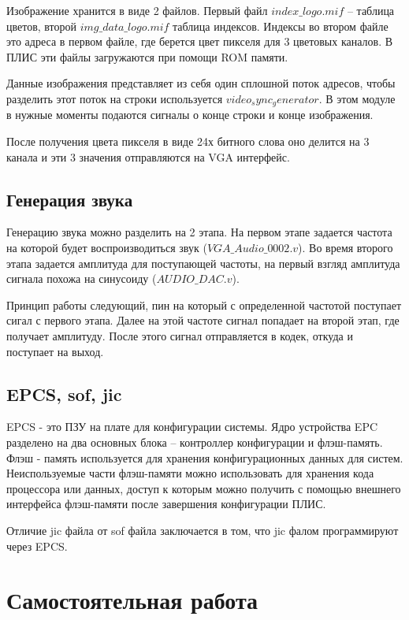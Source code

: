 \documentclass[a4paper,14pt]{article}
\begin{document}
		Изображение хранится в виде 2 файлов.
		Первый файл $index\_logo.mif$ -- таблица цветов, второй $img\_data\_logo.mif$ таблица индексов.
		Индексы во втором файле это адреса в первом файле, где берется цвет пикселя для 3 цветовых каналов.
		В ПЛИС эти файлы загружаются при помощи ROM памяти.
		
		Данные изображения представляет из себя один сплошной поток адресов, чтобы разделить этот поток на строки используется $video_sync_generator$.
		В этом модуле в нужные моменты подаются сигналы о конце строки и конце изображения.
		
		После получения цвета пикселя в виде 24х битного слова оно делится на 3 канала и эти 3 значения отправляются на VGA интерфейс.
		
	\subsection{Генерация звука}
	
		Генерацию звука можно разделить на 2 этапа.
		На первом этапе задается частота на которой будет воспроизводиться звук ($VGA\_Audio\_0002.v$).
		Во время второго этапа задается амплитуда для поступающей частоты, на первый взгляд амплитуда сигнала похожа на синусоиду ($AUDIO\_DAC.v$).
		
		Принцип работы следующий, пин на который с определенной частотой поступает сигал с первого этапа. 
		Далее на этой частоте сигнал попадает на второй этап, где получает амплитуду.
		После этого сигнал отправляется в кодек, откуда и поступает на выход.
		
	\subsection{EPCS, sof, jic}
		
		EPCS - это ПЗУ на плате для конфигурации системы.
		Ядро устройства EPC разделено на два основных блока -- контроллер конфигурации и флэш-память. 
		Флэш - память используется для хранения конфигурационных данных для систем.
		Неиспользуемые части флэш-памяти можно использовать для хранения кода процессора или данных, доступ к которым можно получить с помощью внешнего интерфейса флэш-памяти после завершения конфигурации ПЛИС.
		
		Отличие jic файла от sof файла заключается в том, что jic фалом программируют через EPCS.  
	

	\section{Самостоятельная работа}
	
\end{document}
